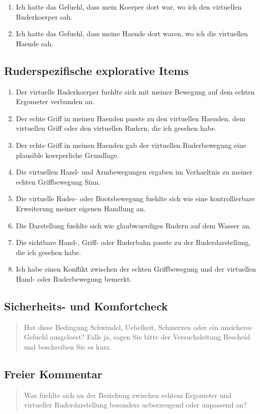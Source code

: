 \begin{enumerate}
    \item Ich hatte das Gefuehl, dass mein Koerper dort war, wo ich den virtuellen Ruderkoerper sah.
    \item Ich hatte das Gefuehl, dass meine Haende dort waren, wo ich die virtuellen Haende sah.
\end{enumerate}

\subsection*{Ruderspezifische explorative Items}

\begin{enumerate}
    \item Der virtuelle Ruderkoerper fuehlte sich mit meiner Bewegung auf dem echten Ergometer verbunden an.
    \item Der echte Griff in meinen Haenden passte zu den virtuellen Haenden, dem virtuellen Griff oder den virtuellen Rudern, die ich gesehen habe.
    \item Der echte Griff in meinen Haenden gab der virtuellen Ruderbewegung eine plausible koerperliche Grundlage.
    \item Die virtuellen Hand- und Armbewegungen ergaben im Verhaeltnis zu meiner echten Griffbewegung Sinn.
    \item Die virtuelle Ruder- oder Bootsbewegung fuehlte sich wie eine kontrollierbare Erweiterung meiner eigenen Handlung an.
    \item Die Darstellung fuehlte sich wie glaubwuerdiges Rudern auf dem Wasser an.
    \item Die sichtbare Hand-, Griff- oder Ruderbahn passte zu der Ruderdarstellung, die ich gesehen habe.
    \item Ich habe einen Konflikt zwischen der echten Griffbewegung und der virtuellen Hand- oder Ruderbewegung bemerkt.
\end{enumerate}

\subsection*{Sicherheits- und Komfortcheck}

\begin{quote}
Hat diese Bedingung Schwindel, Uebelkeit, Schmerzen oder ein unsicheres Gefuehl ausgeloest? Falls ja, sagen Sie bitte der Versuchsleitung Bescheid und beschreiben Sie es kurz.
\end{quote}

\subsection*{Freier Kommentar}

\begin{quote}
Was fuehlte sich an der Beziehung zwischen echtem Ergometer und virtueller Ruderdarstellung besonders ueberzeugend oder unpassend an?
\end{quote}

